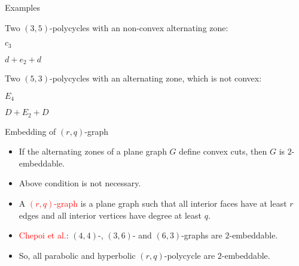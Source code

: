 \documentclass[%
pdf,
colorBG,
slideColor,
]{prosper}
\begin{document}
\begin{slide}{Examples}

Two $(3,5)$-polycycles with an non-convex alternating zone:
\begin{center}
\begin{minipage}[b]{3.7cm}
\centering
{}\par
$c_3$
\end{minipage}
\begin{minipage}[b]{3.7cm}
\centering
{}\par
$d+e_2+d$
\end{minipage}
\end{center}
Two $(5,3)$-polycycles with an alternating zone, which is not convex:
\begin{center}
\begin{minipage}[b]{3.7cm}
\centering
{}\par
$E_4$
\end{minipage}
\begin{minipage}[b]{3.7cm}
\centering
{}\par
$D+E_2+D$
\end{minipage}
\end{center}



\end{slide}




\begin{slide}{Embedding of $(r,q)$-graph}
\begin{itemize}
\item If the alternating zones of a plane graph $G$ define convex cuts, 
then $G$ is $2$-embeddable.
\item Above condition is not necessary.
\item A \textcolor{red}{$(r,q)$-graph} is a plane graph such that all interior faces have at least $r$ edges and all interior vertices have degree at least $q$.
\item \textcolor{red}{Chepoi et al.}: $(4,4)$-, $(3,6)$- and 
$(6,3)$-graphs are $2$-embeddable.
\item So, all parabolic and hyperbolic $(r,q)$-polycycle are $2$-embeddable.
\end{itemize}
\end{slide}
\end{document}
